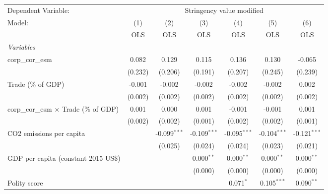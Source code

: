 
\begingroup
\centering
\begin{tabular}{lcccccc}
   \toprule
   Dependent Variable: & \multicolumn{6}{c}{Stringency value modified}\\
   Model:                                        & (1)     & (2)            & (3)            & (4)            & (5)            & (6)\\  
                                                 &  OLS    & OLS            & OLS            & OLS            & OLS            & OLS\\  
   \midrule
   \emph{Variables}\\
   corp\_cor\_esm                                & 0.082   & 0.129          & 0.115          & 0.136          & 0.130          & -0.065\\   
                                                 & (0.232) & (0.206)        & (0.191)        & (0.207)        & (0.245)        & (0.239)\\   
   Trade (\% of GDP)                             & -0.001  & -0.002         & -0.002         & -0.002         & -0.002         & 0.002\\   
                                                 & (0.002) & (0.002)        & (0.002)        & (0.002)        & (0.002)        & (0.002)\\   
   corp\_cor\_esm $\times$ Trade (\% of GDP)     & 0.001   & 0.000          & 0.001          & -0.001         & -0.001         & 0.001\\   
                                                 & (0.002) & (0.002)        & (0.001)        & (0.002)        & (0.002)        & (0.001)\\   
   CO2 emissions per capita                      &         & -0.099$^{***}$ & -0.109$^{***}$ & -0.095$^{***}$ & -0.104$^{***}$ & -0.121$^{***}$\\   
                                                 &         & (0.025)        & (0.024)        & (0.024)        & (0.023)        & (0.021)\\   
   GDP per capita (constant 2015 US\$)           &         &                & 0.000$^{**}$   & 0.000$^{**}$   & 0.000$^{**}$   & 0.000$^{**}$\\   
                                                 &         &                & (0.000)        & (0.000)        & (0.000)        & (0.000)\\   
   Polity score                                  &         &                &                & 0.071$^{*}$    & 0.105$^{***}$  & 0.090$^{**}$\\   

\end{tabular}
